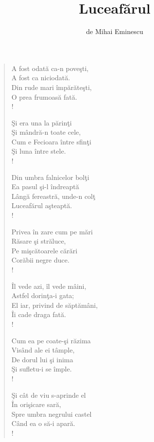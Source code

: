 \documentclass{article}
\title{Luceafărul}
\author{de Mihai Eminescu}
\date{}
\begin{document}
\maketitle

\iffalse
\settowidth{\versewidth}{- Dar nici nu ştiu măcar ce-mi ceri}
\setlength{\columnsep}{0cm}
\begin{small}
\begin{multicols}{3}
\begin{verse}
A fost odată ca-n poveşti, \\
A fost ca niciodată. \\
Din rude mari împărăteşti, \\
O prea frumoasă fată. \\!

Şi era una la părinţi \\
Şi mândră-n toate cele, \\
Cum e Fecioara între sfinţi \\
Şi luna între stele. \\!

Din umbra falnicelor bolţi \\
Ea pasul şi-l îndreaptă \\
Lângă fereastră, unde-n colţ \\
Luceafărul aşteaptă. \\!

Privea în zare cum pe mări \\
Răsare şi străluce, \\
Pe mişcătoarele cărări \\
Corăbii negre duce. \\!

Îl vede azi, îl vede mâini, \\
Astfel dorinţa-i gata; \\
El iar, privind de săptămâni, \\
Îi cade draga fată. \\!

Cum ea pe coate-şi răzima \\
Visând ale ei tâmple, \\
De dorul lui şi inima \\
Şi sufletu-i se împle. \\!

Şi cât de viu s-aprinde el \\
În orişicare sară, \\
Spre umbra negrului castel \\
Când ea o să-i apară. \\!


\end{verse}
\end{multicols}
\end{small}
\end{document}
